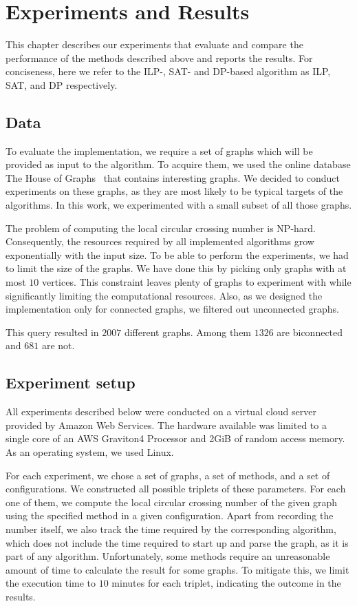 \chapter{Experiments and Results}\label{ch:experiments-and-results}

This chapter describes our experiments that evaluate and compare the performance of the methods described above and reports the results. For conciseness, here we refer to the ILP-, SAT- and DP-based algorithm as \textsf{ILP}, \textsf{SAT}, and \textsf{DP} respectively.

\section{Data}

To evaluate the implementation, we require a set of graphs which will be provided as input to the algorithm. To acquire them, we used the online database The House of Graphs~\cite{HoG} that contains interesting graphs. We decided to conduct experiments on these graphs, as they are most likely to be typical targets of the algorithms. In this work, we experimented with a small subset of all those graphs.

The problem of computing the local circular crossing number is NP-hard. Consequently, the resources required by all implemented algorithms grow exponentially with the input size. To be able to perform the experiments, we had to limit the size of the graphs. We have done this by picking only graphs with at most \(10\) vertices. This constraint leaves plenty of graphs to experiment with while significantly limiting the computational resources. Also, as we designed the implementation only for connected graphs, we filtered out unconnected graphs.

This query resulted in \(2007\) different graphs. Among them \(1326\) are biconnected and \(681\) are not.


\section{Experiment setup}

All experiments described below were conducted on a virtual cloud server provided by Amazon Web Services. The hardware available was limited to a single core of an AWS Graviton4 Processor and 2GiB of random access memory. As an operating system, we used Linux.

For each experiment, we chose a set of graphs, a set of methods, and a set of configurations. We constructed all possible triplets of these parameters. For each one of them, we compute the local circular crossing number of the given graph using the specified method in a given configuration. Apart from recording the number itself, we also track the time required by the corresponding algorithm, which does not include the time required to start up and parse the graph, as it is part of any algorithm. Unfortunately, some methods require an unreasonable amount of time to calculate the result for some graphs. To mitigate this, we limit the execution time to \(10\) minutes for each triplet, indicating the outcome in the results.

